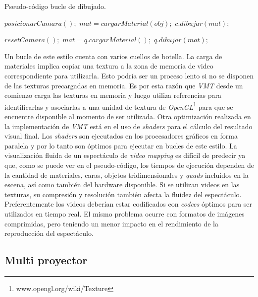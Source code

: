 \begin{algorithm}
    \caption{Pseudo-código bucle de dibujado.}
    \label{alg:mainLoop}
    \begin{algorithmic}
      \State $posicionarCamara();$
             \State $mat = cargarMaterial(obj);$
             \State $c.dibujar(mat);$
         \EndFor
      \EndFor

      \State $resetCamara();$
         \State $mat = q.cargarMaterial();$
         \State $q.dibujar(mat);$
      \EndFor
    \end{algorithmic}
\end{algorithm}

Un bucle de este estilo cuenta con varios cuellos de botella.
La carga de materiales implica copiar una textura a la zona de memoria de video correspondiente para utilizarla. Esto podría ser un proceso lento si no se disponen de las texturas precargadas en memoria. Es por esta razón que \emph{VMT} desde un comienzo carga las texturas en memoria y luego utiliza referencias para identificarlas y asociarlas a una unidad de textura de \emph{OpenGL}\footnote{www.opengl.org/wiki/Texture} para que se encuentre disponible al momento de ser utilizada.
Otra optimización realizada en la implementación de \emph{VMT} está en el uso de \emph{shaders} para el cálculo del resultado visual final. Los \emph{shaders} son ejecutados en los procesadores gráficos en forma paralela y por lo tanto son óptimos para ejecutar en bucles de este estilo.
La visualización fluida de un espectáculo de \emph{video mapping} es difícil de predecir ya que, como se puede ver en el pseudo-código, los tiempos de ejecución dependen de la cantidad de materiales, caras, objetos tridimensionales y \emph{quads} incluidos en la escena, así como también del hardware disponible.
Si se utilizan videos en las texturas, su compresión y resolución también afecta la fluidez del espectáculo. Preferentemente los videos deberían estar codificados con \emph{codecs} óptimos para ser utilizados en tiempo real. El mismo problema ocurre con formatos de imágenes comprimidas, pero teniendo un menor impacto en el rendimiento de la reproducción del espectáculo.

\subsection{Multi proyector}

